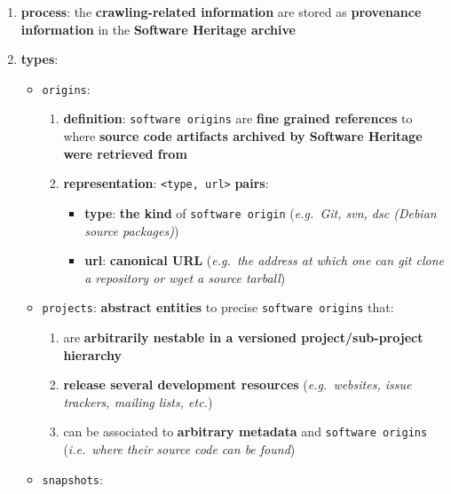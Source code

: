 \documentclass[11pt]{article}
\providecommand{\tightlist}{%
      \setlength{\itemsep}{0pt}\setlength{\parskip}{0pt}}
\begin{document}
\begin{enumerate}
\def\labelenumi{\arabic{enumi}.}
\tightlist
\item
  \textbf{process}: the \textbf{crawling-related information} are stored
  as \textbf{provenance information} in the \textbf{Software Heritage
  archive}
\item
  \textbf{types}:

  \begin{itemize}
  \tightlist
  \item
    \texttt{origins}:

    \begin{enumerate}
    \def\labelenumii{\arabic{enumii}.}
    \tightlist
    \item
      \textbf{definition}: \texttt{software\ origins} are \textbf{fine
      grained references} to where \textbf{source code artifacts
      archived by Software Heritage were retrieved from}
    \item
      \textbf{representation}:
      \texttt{\textless{}type,\ url\textgreater{}} \textbf{pairs}:

      \begin{itemize}
      \tightlist
      \item
        \textbf{type}: \textbf{the kind} of \texttt{software\ origin}
        (\emph{e.g.~Git, svn, dsc (Debian source packages)})
      \item
        \textbf{url}: \textbf{canonical URL} (\emph{e.g.~the address at
        which one can git clone a repository or wget a source tarball})
      \end{itemize}
    \end{enumerate}
  \item
    \texttt{projects}: \textbf{abstract entities} to precise
    \texttt{software\ origins} that:

    \begin{enumerate}
    \def\labelenumii{\arabic{enumii}.}
    \tightlist
    \item
      are \textbf{arbitrarily nestable in a versioned
      project/sub-project hierarchy}
    \item
      \textbf{release several development resources}
      (\emph{e.g.~websites, issue trackers, mailing lists, etc.})
    \item
      can be associated to \textbf{arbitrary metadata} and
      \texttt{software\ origins} (\emph{i.e.~where their source code can
      be found})
    \end{enumerate}
  \item
    \texttt{snapshots}:


\end{itemize}
\end{enumerate}
\end{document}
